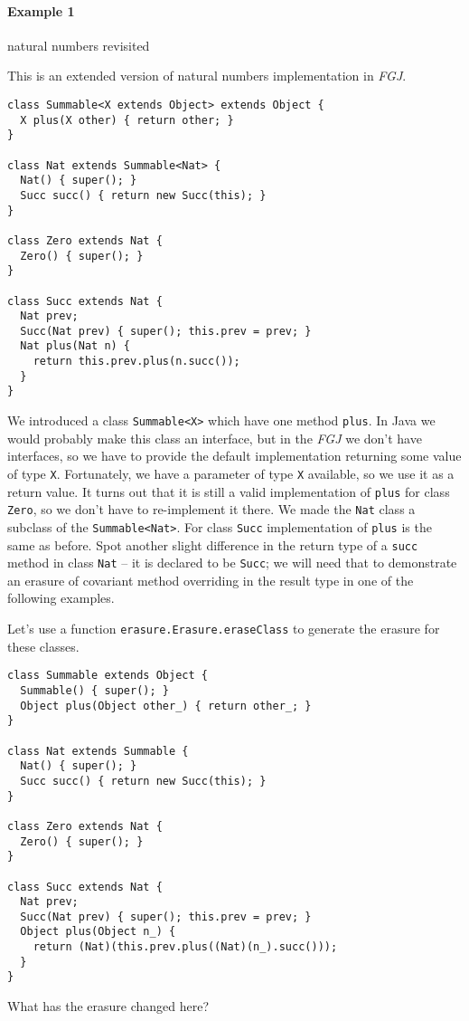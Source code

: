 \documentclass{article}[12pt]
\begin{document}
\paragraph{Example 1} natural numbers revisited

This is an extended version of natural numbers implementation in
\emph{FGJ}.

\begin{verbatim}
class Summable<X extends Object> extends Object {
  X plus(X other) { return other; }
}

class Nat extends Summable<Nat> {
  Nat() { super(); }
  Succ succ() { return new Succ(this); }
}

class Zero extends Nat { 
  Zero() { super(); }
}

class Succ extends Nat {
  Nat prev;
  Succ(Nat prev) { super(); this.prev = prev; }
  Nat plus(Nat n) {
    return this.prev.plus(n.succ());
  }
}
\end{verbatim}

We introduced a class \texttt{Summable<X>} which have one method
\texttt{plus}. In Java we would probably make this class an
interface, but in the \emph{FGJ} we don't have interfaces, so we have
to provide the default implementation returning some value of type
\texttt{X}. Fortunately, we have a parameter of type \texttt{X}
available, so we use it as a return value. It turns out that it
is still a valid implementation of \texttt{plus} for class
\texttt{Zero}, so we don't have to re-implement it there. We made
the \texttt{Nat} class a subclass of the \texttt{Summable<Nat>}.
For class \texttt{Succ} implementation of \texttt{plus} is the same
as before. Spot another slight difference in the return type
of a \texttt{succ} method in class \texttt{Nat} -- it is
declared to be \texttt{Succ}; we will need that to demonstrate
an erasure of covariant method overriding in the result type in
one of the following examples.

Let's use a function \texttt{erasure.Erasure.eraseClass} to generate
the erasure for these classes.

\begin{verbatim}
class Summable extends Object {
  Summable() { super(); }
  Object plus(Object other_) { return other_; }
}

class Nat extends Summable {
  Nat() { super(); }
  Succ succ() { return new Succ(this); }
}

class Zero extends Nat { 
  Zero() { super(); }
}

class Succ extends Nat {
  Nat prev;
  Succ(Nat prev) { super(); this.prev = prev; }
  Object plus(Object n_) {
    return (Nat)(this.prev.plus((Nat)(n_).succ())); 
  }
}
\end{verbatim}
What has the erasure changed here?
\end{document}

